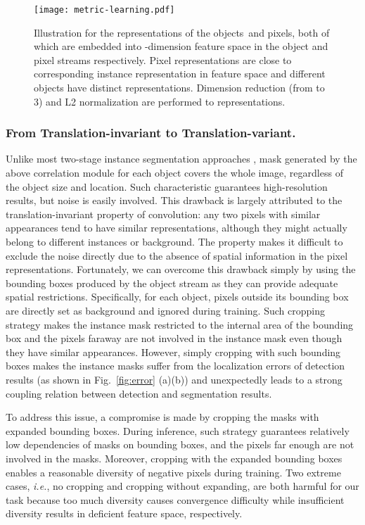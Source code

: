 \documentclass[letterpaper]{article} \usepackage{aaai20}  \usepackage{times}  \usepackage{helvet} \usepackage{courier}  \usepackage[hyphens]{url}  \usepackage{graphicx} \urlstyle{rm} \def\UrlFont{\rm}  \usepackage{graphicx}  \frenchspacing  \setlength{\pdfpagewidth}{8.5in}  \setlength{\pdfpageheight}{11in}
\newcommand{\ie}{\textit{i.e.}}
\begin{document}
\begin{figure}[t]
	\centering
	\texttt{[image: metric-learning.pdf]}
	\caption{Illustration for the representations of the objects\footnotemark\, and pixels, both of which are embedded into -dimension feature space in the object and pixel streams respectively. Pixel representations are close to corresponding instance representation in feature space and different objects have distinct representations. Dimension reduction (from  to 3) and L2 normalization are performed to representations.}
	\label{fig:metric}
\end{figure}

\subsubsection{From Translation-invariant to Translation-variant.}

Unlike most two-stage instance segmentation approaches \cite{he2017mask}, mask generated by the above correlation module for each object covers the whole image, regardless of the object size and location.  Such characteristic guarantees high-resolution results, but noise is easily involved.  This drawback is largely attributed to the translation-invariant property of convolution: any two pixels with similar appearances tend to have similar representations, although they might actually belong to different instances or background. The property makes it difficult to exclude the noise directly due to the absence of spatial information in the pixel representations. Fortunately, we can overcome this drawback simply by using the bounding boxes produced by the object stream as they can provide adequate spatial restrictions. Specifically, for each object, pixels outside its bounding box are directly set as background and ignored during training. Such cropping strategy makes the instance mask restricted to the internal area of the bounding box and the pixels faraway are not involved in the instance mask even though they have similar appearances. However, simply cropping with such bounding boxes makes the instance masks suffer from the localization errors of detection results (as shown in Fig.~\ref{fig:error} (a)(b)) and unexpectedly leads to a strong coupling relation between detection and segmentation results.

To address this issue, a compromise is made by cropping the masks with expanded bounding boxes. During inference, such strategy guarantees relatively low dependencies of masks on bounding boxes, and the pixels far enough are not involved in the masks. Moreover, cropping with the expanded bounding boxes enables a reasonable diversity of negative pixels during training. Two extreme cases, \ie, no cropping and cropping without expanding, are both harmful for our task because too much diversity causes convergence difficulty while insufficient diversity results in deficient feature space, respectively.
\end{document}
